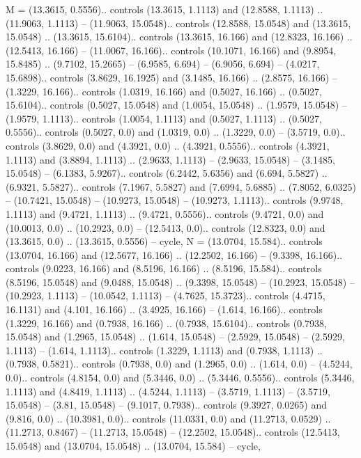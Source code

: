 {M} = {(13.3615, 0.5556).. controls (13.3615, 1.1113) and (12.8588, 1.1113) .. (11.9063, 1.1113) -- (11.9063, 15.0548).. controls (12.8588, 15.0548) and (13.3615, 15.0548) .. (13.3615, 15.6104).. controls (13.3615, 16.166) and (12.8323, 16.166) .. (12.5413, 16.166) -- (11.0067, 16.166).. controls (10.1071, 16.166) and (9.8954, 15.8485) .. (9.7102, 15.2665) -- (6.9585, 6.694) -- (6.9056, 6.694) -- (4.0217, 15.6898).. controls (3.8629, 16.1925) and (3.1485, 16.166) .. (2.8575, 16.166) -- (1.3229, 16.166).. controls (1.0319, 16.166) and (0.5027, 16.166) .. (0.5027, 15.6104).. controls (0.5027, 15.0548) and (1.0054, 15.0548) .. (1.9579, 15.0548) -- (1.9579, 1.1113).. controls (1.0054, 1.1113) and (0.5027, 1.1113) .. (0.5027, 0.5556).. controls (0.5027, 0.0) and (1.0319, 0.0) .. (1.3229, 0.0) -- (3.5719, 0.0).. controls (3.8629, 0.0) and (4.3921, 0.0) .. (4.3921, 0.5556).. controls (4.3921, 1.1113) and (3.8894, 1.1113) .. (2.9633, 1.1113) -- (2.9633, 15.0548) -- (3.1485, 15.0548) -- (6.1383, 5.9267).. controls (6.2442, 5.6356) and (6.694, 5.5827) .. (6.9321, 5.5827).. controls (7.1967, 5.5827) and (7.6994, 5.6885) .. (7.8052, 6.0325) -- (10.7421, 15.0548) -- (10.9273, 15.0548) -- (10.9273, 1.1113).. controls (9.9748, 1.1113) and (9.4721, 1.1113) .. (9.4721, 0.5556).. controls (9.4721, 0.0) and (10.0013, 0.0) .. (10.2923, 0.0) -- (12.5413, 0.0).. controls (12.8323, 0.0) and (13.3615, 0.0) .. (13.3615, 0.5556) -- cycle},
{N} = {(13.0704, 15.584).. controls (13.0704, 16.166) and (12.5677, 16.166) .. (12.2502, 16.166) -- (9.3398, 16.166).. controls (9.0223, 16.166) and (8.5196, 16.166) .. (8.5196, 15.584).. controls (8.5196, 15.0548) and (9.0488, 15.0548) .. (9.3398, 15.0548) -- (10.2923, 15.0548) -- (10.2923, 1.1113) -- (10.0542, 1.1113) -- (4.7625, 15.3723).. controls (4.4715, 16.1131) and (4.101, 16.166) .. (3.4925, 16.166) -- (1.614, 16.166).. controls (1.3229, 16.166) and (0.7938, 16.166) .. (0.7938, 15.6104).. controls (0.7938, 15.0548) and (1.2965, 15.0548) .. (1.614, 15.0548) -- (2.5929, 15.0548) -- (2.5929, 1.1113) -- (1.614, 1.1113).. controls (1.3229, 1.1113) and (0.7938, 1.1113) .. (0.7938, 0.5821).. controls (0.7938, 0.0) and (1.2965, 0.0) .. (1.614, 0.0) -- (4.5244, 0.0).. controls (4.8154, 0.0) and (5.3446, 0.0) .. (5.3446, 0.5556).. controls (5.3446, 1.1113) and (4.8419, 1.1113) .. (4.5244, 1.1113) -- (3.5719, 1.1113) -- (3.5719, 15.0548) -- (3.81, 15.0548) -- (9.1017, 0.7938).. controls (9.3927, 0.0265) and (9.816, 0.0) .. (10.3981, 0.0).. controls (11.0331, 0.0) and (11.2713, 0.0529) .. (11.2713, 0.8467) -- (11.2713, 15.0548) -- (12.2502, 15.0548).. controls (12.5413, 15.0548) and (13.0704, 15.0548) .. (13.0704, 15.584) -- cycle},
